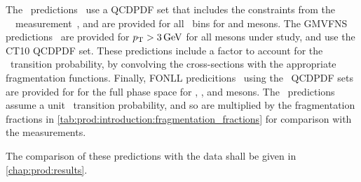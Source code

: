 The \nnpdfl\ predictions~\cite{Gauld:2015yia} use a \ac{QCDPDF} set that 
includes the constraints from the \ \lhcb\ 
measurement~\cite{LHCb-PAPER-2012-041}, and are provided for all \pTy\ bins for 
\PDz and \PDp mesons.
The \ac{GMVFNS} predictions~\cite{Kniehl:2012ti} are provided for $\pT > 
\SI{3}{\GeV}$ for all mesons under study, and use the CT10 \ac{QCDPDF} set.
These predictions include a factor to account for the \cToHc\ transition 
probability, by convolving the \decay{\ccbar}{\PHc} cross-sections with the 
appropriate fragmentation functions.
Finally, \ac{FONLL} predicitions~\cite{Cacciari:2015fta} using the \nnpdf\ 
\ac{QCDPDF} sets are provided for for the full \pTy phase space for \PDz, \PDp, 
and \PDstarp mesons.
The \fonll\ predictions assume a unit \cToHc\ transition probability, and so 
are multiplied by the fragmentation fractions in 
\cref{tab:prod:introduction:fragmentation_fractions} for comparison with the 
measurements.

The comparison of these predictions with the data shall be given in 
\cref{chap:prod:results}.
